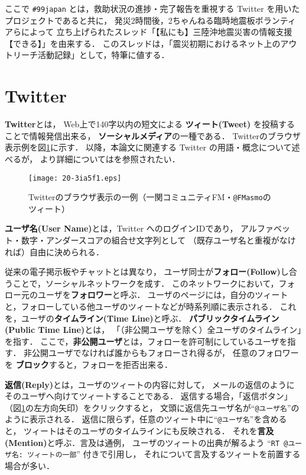 \documentclass[japanese]{jnlp_1.4}
\begin{document}
ここで {\tt \#99japan} とは，救助状況の進捗・完了報告を重視する Twitter を用いたプロジェクトであると共に，
発災2時間後，2ちゃんねる臨時地震板ボランティアらによって
立ち上げられたスレッド「【私にも】三陸沖地震災害の情報支援【できる】」\cite{2ch}を由来する．
このスレッドは，「震災初期におけるネット上のアウトリーチ活動記録」として，特筆に値する．


\section{Twitter}

{\bf Twitter}とは，
Web上で140字以内の短文による
{\bf ツィート(Tweet)}
を投稿することで情報発信出来る，
{\bf ソーシャルメディア}の一種である．
Twitterのブラウザ表示例を図\ref{fig:Twitter}に示す．
以降，本論文に関連する Twitter の用語・概念について述べるが，
より詳細については\cite{Twitter_help}を参照されたい．

\begin{figure}[b]
  \begin{center}
    \texttt{[image: 20-3ia5f1.eps]}
  \end{center}
  \caption{Twitterのブラウザ表示の一例（一関コミュニティFM・{\tt @FMasmo}のツィート）}
  \label{fig:Twitter}
\end{figure}

{\bf ユーザ名(User Name)}とは，Twitter へのログインIDであり，
{アルファベット・数字・アンダースコアの組合せ文字列}として
（既存ユーザ名と重複がなければ）自由に決められる．

従来の電子掲示板やチャットとは異なり，
ユーザ同士が{\bf フォロー(Follow)}し合うことで，ソーシャルネットワークを成す．
このネットワークにおいて，フォロー元のユーザを{\bf フォロワー}と呼ぶ．
ユーザのページには，自分のツィートと，フォローしている他ユーザのツィートなどが時系列順に表示される．
これを，ユーザの{\bf タイムライン(Time Line)}と呼ぶ．
{\bf パブリックタイムライン(Public Time Line)}とは，
「（非公開ユーザを除く）全ユーザのタイムライン」を指す．
ここで，{\bf 非公開ユーザ}とは，フォローを許可制にしているユーザを指す．
非公開ユーザでなければ誰からもフォローされ得るが，
任意のフォロワーを
{\bf ブロック}すると，フォローを拒否出来る．


{\bf 返信(Reply)}とは，ユーザのツィートの内容に対して，
メールの返信のようにそのユーザへ向けてツィートすることである．
返信する場合，「返信ボタン」（図\ref{fig:Twitter}の左方向矢印）をクリックすると，
文頭に返信先ユーザ名が``{\tt @ユーザ名}''のように表示される．
返信に限らず，任意のツィート中に``{\tt @ユーザ名}''を含めると，
ツィートはそのユーザのタイムラインにも反映される．
それを{\bf 言及(Mention)}と呼ぶ．言及は通例，
ユーザのツィートの出典が解るよう
``{\tt RT @ユーザ名: ツィートの一部}'' 付きで引用し，
それについて言及するツィートを前置する場合が多い．
\end{document}
